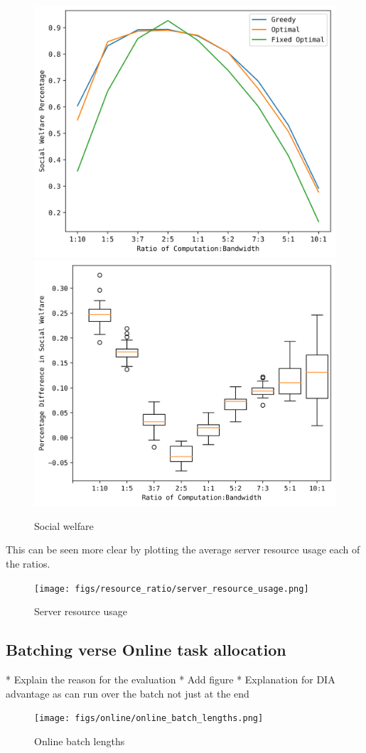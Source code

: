 \begin{figure}
    \centering
    \includegraphics[width=0.45\linewidth]{figs/resource_ratio/social_welfare_percentage.png}
    \includegraphics[width=0.45\linewidth]{figs/resource_ratio/social_welfare_difference.png}
    \caption{Social welfare}
    \label{fig:resource-ratio-social-welfare}
\end{figure}

This can be seen more clear by plotting the average server resource usage each of the ratios.
\begin{figure}
    \centering
    \texttt{[image: figs/resource\_ratio/server\_resource\_usage.png]}
    \caption{Server resource usage}
    \label{fig:resource-ratio-server-resource-usage}
\end{figure}

\subsection{Batching verse Online task allocation}
\label{subsec:batching-verse-online-task-allocation}
* Explain the reason for the evaluation
* Add figure
* Explanation for DIA advantage as can run over the batch not just at the end

\begin{figure}
    \centering
    \texttt{[image: figs/online/online\_batch\_lengths.png]}
    \caption{Online batch lengths}
    \label{fig:batch-task-allocation}
\end{figure}